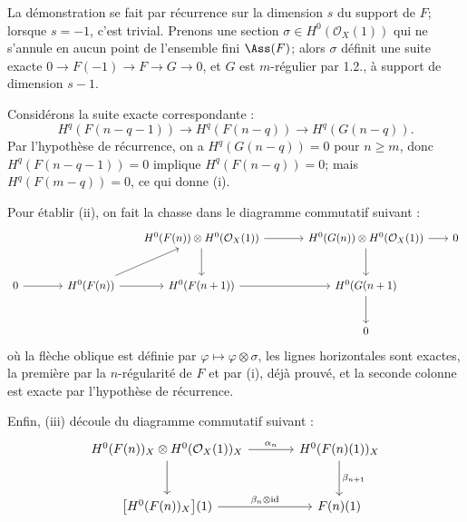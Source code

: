 La
démonstration se fait par récurrence sur la dimension \(s\) du support de \(F\); lorsque \(s=-1\), c'est trivial. Prenons une section \(\sigma\in H^0(\mathcal O_X(1))\) qui ne s'annule en aucun point de l'ensemble fini \(\Ass(F)\); alors \(\sigma\) définit une suite exacte \(0\longrightarrow F(-1)\longrightarrow F\longrightarrow G\longrightarrow 0\), et \(G\) est \(m\)-régulier par 1.2., à support de dimension \(s-1\).

Considérons la suite exacte correspondante :
\[
H^q(F(n-q-1))\longrightarrow H^q(F(n-q))\longrightarrow H^q(G(n-q)).
\]
Par l'hypothèse de récurrence, on a \(H^q(G(n-q))=0\) pour \(n\ge m\), donc \(H^q(F(n-q-1))=0\) implique \(H^q(F(n-q))=0\); mais \(H^q(F(m-q))=0\), ce qui donne (i).

Pour établir (ii), on fait la chasse dans le diagramme commutatif suivant :
\[
\begin{tikzcd}[column sep=1.8em,row sep=2.5em]
 & & & H^0(F(n))\otimes H^0(\mathcal O_X(1)) \arrow[rr] \arrow[d]
 & & H^0(G(n))\otimes H^0(\mathcal O_X(1)) \arrow[r] \arrow[d]
 & 0 \\
0 \arrow[rr]
& & H^0(F(n)) \arrow[ur] \arrow[r]
& H^0(F(n+1)) \arrow[rr]
& & H^0(G(n+1) \arrow[d] \\
& & & & & 0
\end{tikzcd}
\]
où la flèche oblique est définie par \(\varphi\mapsto\varphi\otimes\sigma\), les lignes horizontales sont exactes, la première par la \(n\)-régularité de \(F\) et par (i), déjà prouvé, et la seconde colonne est exacte par l'hypothèse de récurrence.

Enfin, (iii) découle du diagramme commutatif suivant :
\[
\begin{tikzcd}[column sep=large,row sep=large]
H^0(F(n))_X\otimes H^0(\mathcal O_X(1))_X
  \arrow[r,"\alpha_n"]
  \arrow[d]
& H^0(F(n)(1))_X
  \arrow[d,"\beta_{n+1}"] \\
\bigl[H^0(F(n))_X\bigr](1)
  \arrow[r,"\beta_n\otimes\mathrm{id}"]
& F(n)(1)
\end{tikzcd}
\]
